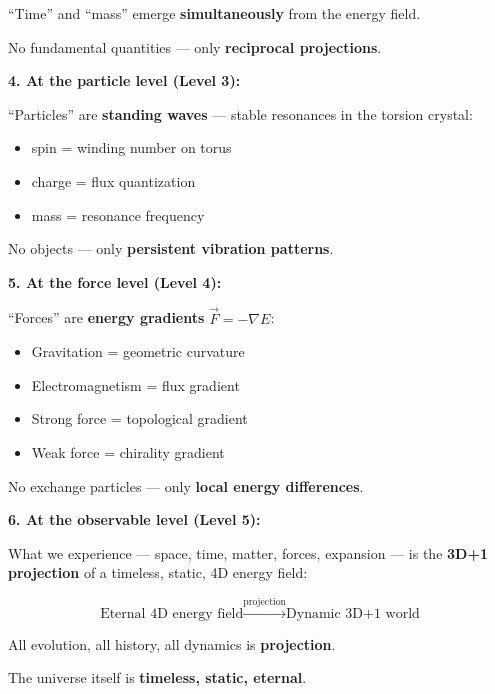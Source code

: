 \begin{revolutionary}
		\vspace{0.3cm}

		\enquote{Time} and \enquote{mass} emerge \textbf{simultaneously} from the energy field.

		No fundamental quantities — only \textbf{reciprocal projections}.

		\vspace{0.5cm}

		\textbf{4. At the particle level (Level 3):}

		\enquote{Particles} are \textbf{standing waves} — stable resonances in the torsion crystal:
		\begin{itemize}
			\item spin = winding number on torus
			\item charge = flux quantization
			\item mass = resonance frequency
		\end{itemize}

		\vspace{0.3cm}

		No objects — only \textbf{persistent vibration patterns}.

		\vspace{0.5cm}

		\textbf{5. At the force level (Level 4):}

		\enquote{Forces} are \textbf{energy gradients} $\vec{F} = -\nabla E$:
		\begin{itemize}
			\item Gravitation = geometric curvature
			\item Electromagnetism = flux gradient
			\item Strong force = topological gradient
			\item Weak force = chirality gradient
		\end{itemize}

		\vspace{0.3cm}

		No exchange particles — only \textbf{local energy differences}.

		\vspace{0.5cm}

		\textbf{6. At the observable level (Level 5):}

		What we experience — space, time, matter, forces, expansion — is the \textbf{3D+1 projection} of a timeless, static, 4D energy field:

		\begin{equation}
			\text{Eternal 4D energy field} \xrightarrow{\text{projection}} \text{Dynamic 3D+1 world}
		\end{equation}

		\vspace{0.3cm}

		All evolution, all history, all dynamics is \textbf{projection}.

		The universe itself is \textbf{timeless, static, eternal}.
	\end{revolutionary}

